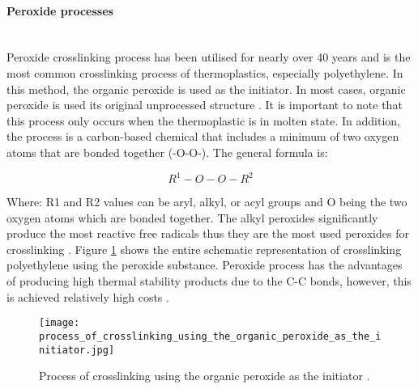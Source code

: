 \paragraph{Peroxide processes} \hfill \\
 Peroxide crosslinking process has been utilised for nearly over 40 years and is the most common crosslinking process of thermoplastics, especially polyethylene. In this method, the organic peroxide is used as the initiator. In most cases, organic peroxide is used its original unprocessed structure \cite{meola2005cross}. It is important to note that this process only occurs when the thermoplastic is in molten state. In addition, the process is a carbon-based chemical that includes a minimum of two oxygen atoms that are bonded together (-O-O-). The general formula is:  

 \begin{equation}
    R^1-O-O-R^2
 \end{equation}

Where: R1 and R2 values can be aryl, alkyl, or acyl groups and O being the two oxygen atoms which are bonded together. The alkyl peroxides significantly produce the most reactive free radicals thus they are the most used peroxides for crosslinking \cite{kurtz2009cross}. Figure \ref{ch3:figure:crosslinking_process} shows the entire schematic representation of crosslinking polyethylene using the peroxide substance. Peroxide process has the advantages of producing high thermal stability products due to the C-C bonds, however, this is achieved relatively high costs \cite{patterson2022cross}.

\begin{figure}[H]
    \centering
    \texttt{[image: process\_of\_crosslinking\_using\_the\_organic\_peroxide\_as\_the\_initiator.jpg]}
    \caption{Process of crosslinking using the organic peroxide as the initiator \cite{meola2005cross}. }
    \label{ch3:figure:crosslinking_process}
\end{figure}

